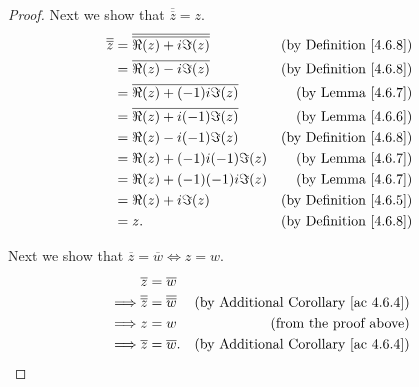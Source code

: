 \begin{proof}
    Next we show that \(\overline{\overline{z}} = z\).
    \begin{align*}
        \overline{\overline{z}} & = \overline{\overline{\Re(z) + i \Im(z)}} & \text{(by Definition \ref{4.6.8})} \\
                                & = \overline{\Re(z) - i \Im(z)}            & \text{(by Definition \ref{4.6.8})} \\
                                & = \overline{\Re(z) + (-1) i \Im(z)}       & \text{(by Lemma \ref{4.6.7})}      \\
                                & = \overline{\Re(z) + i (-1) \Im(z)}       & \text{(by Lemma \ref{4.6.6})}      \\
                                & = \Re(z) - i (-1) \Im(z)                  & \text{(by Definition \ref{4.6.8})} \\
                                & = \Re(z) + (-1) i (-1) \Im(z)             & \text{(by Lemma \ref{4.6.7})}      \\
                                & = \Re(z) + (-1) (-1) i \Im(z)             & \text{(by Lemma \ref{4.6.7})}      \\
                                & = \Re(z) + i \Im(z)                       & \text{(by Definition \ref{4.6.5})} \\
                                & = z.                                      & \text{(by Definition \ref{4.6.8})}
    \end{align*}

    Next we show that \(\overline{z} = \overline{w} \iff z = w\).
    \begin{align*}
                 & \overline{z} = \overline{w}                                                                         \\
        \implies & \overline{\overline{z}} = \overline{\overline{w}} & \text{(by Additional Corollary \ref{ac 4.6.4})} \\
        \implies & z = w                                             & \text{(from the proof above)}                   \\
        \implies & \overline{z} = \overline{w}.                      & \text{(by Additional Corollary \ref{ac 4.6.4})}
    \end{align*}


\end{proof}
